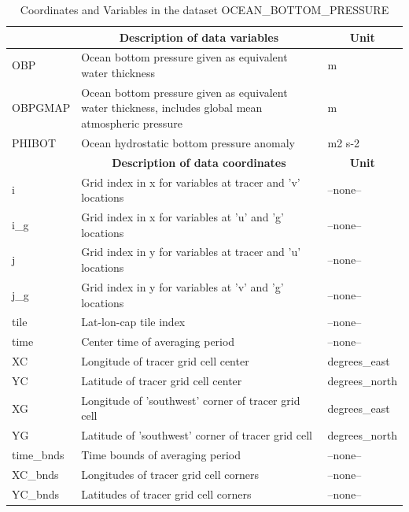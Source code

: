\begin{longtable}{|m{}|m{}|m{}|}
\caption{Coordinates and Variables in the dataset OCEAN\_BOTTOM\_PRESSURE}
\label{tab:table-OCEAN_BOTTOM_PRESSURE-fields} \\ 
\hline \endhead \hline \endfoot
\rowcolor{lightgray} \multicolumn{1}{|c|}{\textbf{Variables}} & \multicolumn{1}{|c|}{\textbf{Description of data variables}} &  \multicolumn{1}{|c|}{\textbf{Unit}}\\ \hline
OBP &Ocean bottom pressure given as equivalent water thickness &m  \\ \hline
OBPGMAP &Ocean bottom pressure given as equivalent water thickness, includes global mean atmospheric pressure &m  \\ \hline
PHIBOT &Ocean hydrostatic bottom pressure anomaly &m2 s-2  \\ \hline
\rowcolor{lightgray} \multicolumn{1}{|c|}{\textbf{Coordinates}} & \multicolumn{1}{|c|}{\textbf{Description of data coordinates}} &  \multicolumn{1}{|c|}{\textbf{Unit}}\\ \hline
i &Grid index in x for variables at tracer and 'v' locations &--none--  \\ \hline
i\_g &Grid index in x for variables at 'u' and 'g' locations &--none--  \\ \hline
j &Grid index in y for variables at tracer and 'u' locations &--none--  \\ \hline
j\_g &Grid index in y for variables at 'v' and 'g' locations &--none--  \\ \hline
tile &Lat-lon-cap tile index &--none--  \\ \hline
time &Center time of averaging period &--none--  \\ \hline
XC &Longitude of tracer grid cell center &degrees\_east  \\ \hline
YC &Latitude of tracer grid cell center &degrees\_north  \\ \hline
XG &Longitude of 'southwest' corner of tracer grid cell &degrees\_east  \\ \hline
YG &Latitude of 'southwest' corner of tracer grid cell &degrees\_north  \\ \hline
time\_bnds &Time bounds of averaging period &--none--  \\ \hline
XC\_bnds &Longitudes of tracer grid cell corners &--none--  \\ \hline
YC\_bnds &Latitudes of tracer grid cell corners &--none--  \\ \hline
\end{longtable}

